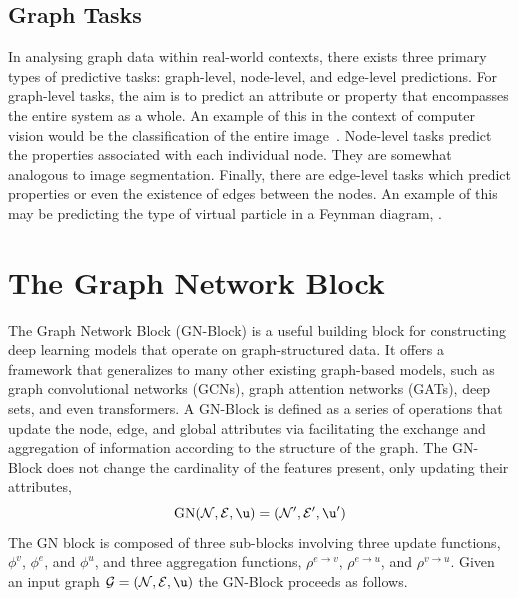 \subsection{Graph Tasks}

In analysing graph data within real-world contexts, there exists three primary types of predictive tasks: graph-level, node-level, and edge-level predictions.
For graph-level tasks, the aim is to predict an attribute or property that encompasses the entire system as a whole.
An example of this in the context of computer vision would be the classification of the entire image~.
Node-level tasks predict the properties associated with each individual node.
They are somewhat analogous to image segmentation.
Finally, there are edge-level tasks which predict  properties or even the existence of edges between the nodes.
An example of this may be predicting the type of virtual particle in a Feynman diagram, .

\section{The Graph Network Block}
\label{sec:gn_block}

The Graph Network Block (GN-Block) is a useful building block for constructing deep learning models that operate on graph-structured data.
It offers a framework that generalizes to many other existing graph-based models, such as graph convolutional networks (GCNs), graph attention networks (GATs), deep sets, and even transformers.
A GN-Block is defined as a series of operations that update the node, edge, and global attributes via facilitating the exchange and aggregation of information according to the structure of the graph.
The GN-Block does not change the cardinality of the features present, only updating their attributes,
\begin{equation}
    \text{GN}(\mathcal{N}, \mathcal{E}, \u) = (\mathcal{N}', \mathcal{E}', \u')
\end{equation}
The GN block is composed of three sub-blocks involving three update functions, $\phi^v$, $\phi^e$, and $\phi^u$, and three aggregation functions, $\rho^{e \to v}$, $\rho^{e \to u}$, and $\rho^{v \to u}$.
Given an input graph $\mathcal{G} = (\mathcal{N}, \mathcal{E}, \u)$ the GN-Block proceeds as follows.

